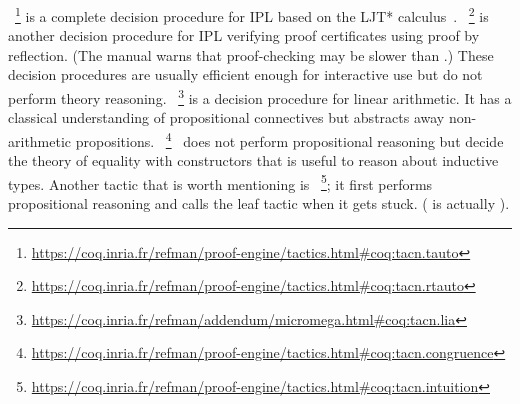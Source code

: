 \documentclass[a4paper,UKenglish,cleveref, autoref, thm-restate]{lipics-v2019}
\begin{document}
~\footnote{\url{https://coq.inria.fr/refman/proof-engine/tactics.html\#coq:tacn.tauto}}
is a complete decision procedure for IPL based on the LJT*
calculus~\cite{Dyckhoff92}.
~\footnote{\url{https://coq.inria.fr/refman/proof-engine/tactics.html\#coq:tacn.rtauto}}
is another decision procedure for IPL verifying proof certificates
using proof by reflection. (The manual warns that proof-checking may
be slower than .) These decision procedures are usually
efficient enough for interactive use but do not perform theory
reasoning. ~\footnote{\url{https://coq.inria.fr/refman/addendum/micromega.html\#coq:tacn.lia}}
is a decision procedure for linear arithmetic. It has a classical
understanding of propositional connectives but abstracts away
non-arithmetic
propositions. ~\footnote{\url{https://coq.inria.fr/refman/proof-engine/tactics.html\#coq:tacn.congruence}}~\cite{Corbineau06}
does not perform propositional reasoning but decide the theory of
equality with constructors that is useful to reason about inductive
types. Another tactic that is worth mentioning is ~\footnote{\url{https://coq.inria.fr/refman/proof-engine/tactics.html\#coq:tacn.intuition}};
it first performs propositional reasoning and calls the leaf tactic
 when it gets stuck. ( is actually
).
\end{document}
